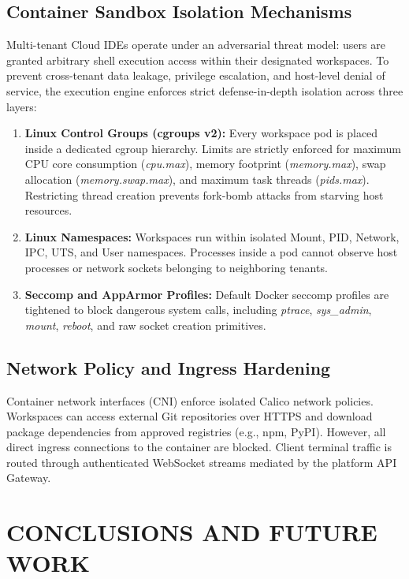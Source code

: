 \documentclass[12pt,a4paper]{report}
\begin{document}
	\section{Container Sandbox Isolation Mechanisms}
	Multi-tenant Cloud IDEs operate under an adversarial threat model: users are granted arbitrary shell execution access within their designated workspaces. To prevent cross-tenant data leakage, privilege escalation, and host-level denial of service, the execution engine enforces strict defense-in-depth isolation across three layers:
	\begin{enumerate}
		\item \textbf{Linux Control Groups (cgroups v2):} Every workspace pod is placed inside a dedicated cgroup hierarchy. Limits are strictly enforced for maximum CPU core consumption (\textit{cpu.max}), memory footprint (\textit{memory.max}), swap allocation (\textit{memory.swap.max}), and maximum task threads (\textit{pids.max}). Restricting thread creation prevents fork-bomb attacks from starving host resources.
		\item \textbf{Linux Namespaces:} Workspaces run within isolated Mount, PID, Network, IPC, UTS, and User namespaces. Processes inside a pod cannot observe host processes or network sockets belonging to neighboring tenants.
		\item \textbf{Seccomp and AppArmor Profiles:} Default Docker seccomp profiles are tightened to block dangerous system calls, including \textit{ptrace}, \textit{sys\_admin}, \textit{mount}, \textit{reboot}, and raw socket creation primitives.
	\end{enumerate}
	
	\section{Network Policy and Ingress Hardening}
	Container network interfaces (CNI) enforce isolated Calico network policies. Workspaces can access external Git repositories over HTTPS and download package dependencies from approved registries (e.g., npm, PyPI). However, all direct ingress connections to the container are blocked. Client terminal traffic is routed through authenticated WebSocket streams mediated by the platform API Gateway.
	
	\chapter{CONCLUSIONS AND FUTURE WORK}
	
\end{document}
